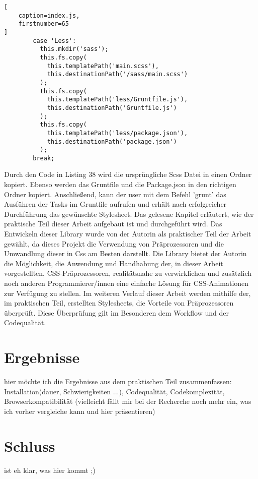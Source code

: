 \begin{lstlisting}[
	caption=index.js,
	firstnumber=65
]
        case 'Less':
          this.mkdir('sass');
          this.fs.copy(
            this.templatePath('main.scss'),
            this.destinationPath('/sass/main.scss')
          );
          this.fs.copy(
            this.templatePath('less/Gruntfile.js'),
            this.destinationPath('Gruntfile.js')
          );
          this.fs.copy(
            this.templatePath('less/package.json'),
            this.destinationPath('package.json')
          );
        break;
\end{lstlisting}
Durch den Code in Listing 38 wird die ursprüngliche Scss Datei in einen Ordner kopiert. Ebenso werden das Gruntfile und die Package.json in den richtigen Ordner kopiert. \newline
Anschließend, kann der user mit dem Befehl 'grunt' das Ausführen der Tasks im Gruntfile aufrufen und erhält nach erfolgreicher Durchführung das gewünschte Stylesheet.
\newline\newline
Das gelesene Kapitel erläutert, wie der praktische Teil dieser Arbeit aufgebaut ist und durchgeführt wird.\newline
Das Entwickeln dieser Library wurde von der Autorin als praktischer Teil der Arbeit gewählt, da dieses Projekt die Verwendung von Präprozessoren und die Umwandlung dieser in Css am Besten darstellt. \newline
Die Library bietet der Autorin die Möglichkeit, die Anwendung und Handhabung der, in dieser Arbeit vorgestellten, CSS-Präprozessoren, realitätsnahe zu verwirklichen und zusätzlich noch anderen Programmierer/innen eine einfache Lösung für CSS-Animationen zur Verfügung zu stellen.\newline\newline
Im weiteren Verlauf dieser Arbeit werden mithilfe der, im praktischen Teil, erstellten Stylesheets, die Vorteile von Präprozessoren überprüft.\newline
Diese Überprüfung gilt im Besonderen dem Workflow und der Codequalität.
\newpage
\section{Ergebnisse}
hier möchte ich die Ergebnisse aus dem praktischen Teil zusammenfassen: Installation(dauer, Schwierigkeiten ...), Codequalität, Codekomplexität, Browserkompatibilität (vielleicht fällt mir bei der Recherche noch mehr ein, was ich vorher vergleiche kann und hier präsentieren)

\section{Schluss}
ist eh klar, was hier kommt ;)




